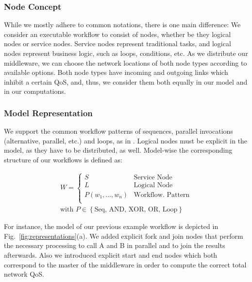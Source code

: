 \documentclass[10pt, conference, compsocconf]{IEEEtran}
\begin{document}
\subsubsection{Node Concept}
\noindent While we mostly adhere to common notations, there is one main difference:
We consider an executable workflow to consist of nodes,
	whether be they logical nodes or service nodes.
Service nodes represent traditional tasks, and logical nodes represent business logic,
	such as loops, conditions, etc.
As we distribute our middleware,
	we can choose the network locations of both node types according to available options.
Both node types have incoming and outgoing links which inhibit a certain QoS,
	and, thus, we consider them both equally in our model and in our computations.

\subsubsection{Model Representation}
\noindent We support the common workflow patterns of sequences, parallel invocations (alternative, parallel, etc.) and loops,
	as in \cite{Jaeger2004}.
Logical nodes must be explicit in the model, as they have to be distributed, as well.
Model-wise the corresponding structure of our workflows is defined as:

\begin{equation*}
	\begin{array}{lcl}
	  \displaystyle
	  	W = \left \{
				\begin{array}{clr}
					S & \mbox{Service Node}\\
					L & \mbox{Logical Node}\\
					P(w_1, ..., w_n) & \mbox{Workflow. Pattern} \\
				\end{array}
			\right .
			\\
			\mbox{with } P \in \left\{\mbox{Seq, AND, XOR, OR, Loop} \right\}
	\end{array}
	\label{eq:doesExceed}
\end{equation*}

\noindent For instance, the model of our previous example workflow is depicted in Fig.~\ref{fig:representations}(a).
We added explicit fork and join nodes that perform the necessary processing to call A and B in parallel and to join the results afterwards.
Also we introduced explicit start and end nodes which both correspond to the master of the middleware
	in order to compute the correct total network QoS.
	
\end{document}
